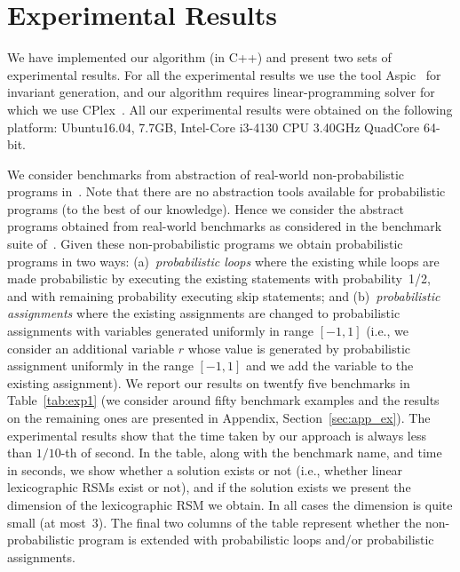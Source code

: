 
\section{Experimental Results}\label{sec:experiments}
We have implemented our algorithm (in C++) and present two sets of experimental results.
For all the experimental results we use the tool Aspic~\cite{FG10:aspic} for 
invariant generation, 
and our algorithm requires linear-programming solver for which we use 
CPlex~\cite{cplex}.
All our experimental results were obtained on the following platform: 
Ubuntu16.04, 7.7GB, Intel-Core i3-4130 CPU 3.40GHz QuadCore 64-bit.


\smallskip{}
We consider benchmarks from abstraction of real-world non-probabilistic programs 
in~\cite{ADFG10:lexicographic}.
Note that there are no abstraction tools available for probabilistic programs 
(to the best of our knowledge). 
Hence we consider the abstract programs obtained from real-world benchmarks as 
considered in the benchmark suite of~\cite{ADFG10:lexicographic}.
Given these non-probabilistic programs we obtain probabilistic programs in two ways:
(a)~{\em probabilistic loops} where the existing while loops are made probabilistic 
by executing the existing statements with probability~1/2, and with remaining 
probability executing skip statements; and
(b)~{\em probabilistic assignments} where the existing assignments are changed to 
probabilistic assignments with variables generated uniformly in range $[-1,1]$ 
(i.e., we consider an additional variable $r$ whose value is generated by 
probabilistic assignment uniformly in the range $[-1,1]$ and we add the variable 
to the existing assignment).
We report our results on twentfy five benchmarks in Table~\ref{tab:exp1} (we 
consider around fifty benchmark examples and the results on the remaining ones 
are presented in Appendix, Section~\ref{sec:app_ex}).
The experimental results show that the time taken by our approach is always less 
than $1/10$-th of second.
In the table, along with the benchmark name, and time in seconds, we show 
whether a solution exists or not (i.e., whether linear lexicographic RSMs exist
or not), and if the solution exists we present the dimension of the lexicographic RSM
we obtain. In all cases the dimension is quite small (at most~3).
The final two columns of the table represent whether the non-probabilistic 
program is extended with probabilistic loops and/or probabilistic assignments.


